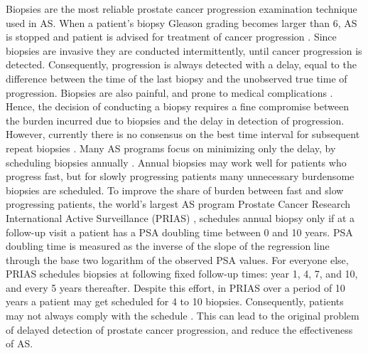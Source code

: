 Biopsies are the most reliable prostate cancer progression examination technique used in AS. When a patient's biopsy Gleason grading becomes larger than 6, AS is stopped and patient is advised for treatment of cancer progression \cite{bokhorst2015compliance}. Since biopsies are invasive they are conducted intermittently, until cancer progression is detected. Consequently, progression is always detected with a delay, equal to the difference between the time of the last biopsy and the unobserved true time of progression. Biopsies are also painful, and prone to medical complications \cite{ehdaie2014impact}. Hence, the decision of conducting a biopsy requires a fine compromise between the burden incurred due to biopsies and the delay in detection of progression. However, currently there is no consensus on the best time interval for subsequent repeat biopsies \cite{loeb2014heterogeneity}. Many AS programs focus on minimizing only the delay, by scheduling biopsies annually \cite{welty2015extended}. Annual biopsies may work well for patients who progress fast, but for slowly progressing patients many unnecessary burdensome biopsies are scheduled. To improve the share of burden between fast and slow progressing patients, the world's largest AS program Prostate Cancer Research International Active Surveillance (PRIAS) \cite{bul2013active}, schedules annual biopsy only if at a follow-up visit a patient has a PSA doubling time between 0 and 10 years. PSA doubling time is measured as the inverse of the slope of the regression line through the base two logarithm of the observed PSA values. For everyone else, PRIAS schedules biopsies at following fixed follow-up times: year 1, 4, 7, and 10, and every 5 years thereafter. Despite this effort, in PRIAS over a period of 10 years a patient may get scheduled for 4 to 10 biopsies. Consequently, patients may not always comply with the schedule \cite{bokhorst2015compliance}. This can lead to the original problem of delayed detection of prostate cancer progression, and reduce the effectiveness of AS.
